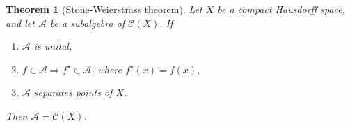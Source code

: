 \documentclass[10pt, oneside, reqno]{amsbook}
\theoremstyle{plain}%
\newtheorem{thm}{Theorem}[section]
\theoremstyle{definition}
\theoremstyle{remark}
\begin{document}

\begin{thm}[Stone-Weierstrass theorem]
    Let $X$ be a compact Hausdorff space, and let $\mathcal{A}$ be a subalgebra of $\mathcal{C}(X)$. If 
    \begin{enumerate}[(1)]
        \item $\mathcal{A}$ is unital,
        \item $f \in \mathcal{A} \Rightarrow f^\star \in \mathcal{A}$, where $f^\star(x) = \overline{f(x)}$,
        \item $\mathcal{A}$ separates points of $X$.
    \end{enumerate}
    Then $\overline{\mathcal{A}} = \mathcal{C}(X)$. 
\end{thm}
\end{document}
